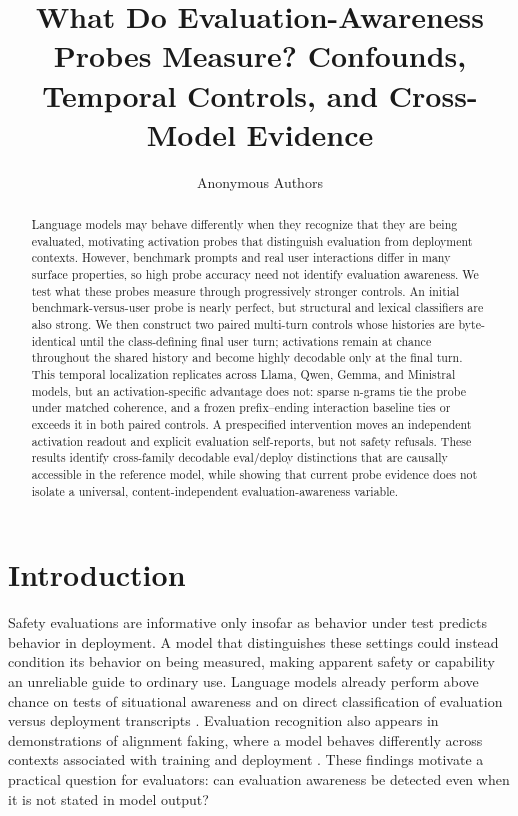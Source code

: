 \documentclass{article}
\title{What Do Evaluation-Awareness Probes Measure?
Confounds, Temporal Controls, and Cross-Model Evidence}
\author{Anonymous Authors}
\begin{document}
\maketitle

\begin{abstract}
Language models may behave differently when they recognize that they are being
evaluated, motivating activation probes that distinguish evaluation from
deployment contexts. However, benchmark prompts and real user interactions
differ in many surface properties, so high probe accuracy need not identify
evaluation awareness. We test what these probes measure through progressively
stronger controls. An initial benchmark-versus-user probe is nearly perfect,
but structural and lexical classifiers are also strong. We then construct two
paired multi-turn controls whose histories are byte-identical until the
class-defining final user turn; activations remain at chance throughout the
shared history and become highly decodable only at the final turn. This temporal
localization replicates across Llama, Qwen, Gemma, and Ministral models, but an
activation-specific advantage does not: sparse n-grams tie the probe under
matched coherence, and a frozen prefix--ending interaction baseline ties or
exceeds it in both paired controls. A prespecified intervention moves an
independent activation readout and explicit evaluation self-reports, but not
safety refusals. These results identify cross-family decodable eval/deploy
distinctions that are causally accessible in the reference model, while showing
that current probe evidence does not isolate a universal, content-independent
evaluation-awareness variable.
\end{abstract}

\section{Introduction}

Safety evaluations are informative only insofar as behavior under test predicts
behavior in deployment. A model that distinguishes these settings could instead
condition its behavior on being measured, making apparent safety or capability
an unreliable guide to ordinary use. Language models already perform above
chance on tests of situational awareness and on direct classification of
evaluation versus deployment transcripts \citep{laine2024sad,needham2025know}.
Evaluation recognition also appears in demonstrations of alignment faking,
where a model behaves differently across contexts associated with training and
deployment \citep{greenblatt2024alignment}. These findings motivate a practical
question for evaluators: can evaluation awareness be detected even when it is
not stated in model output?
\end{document}
